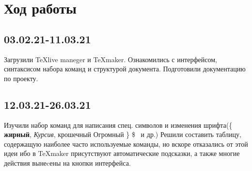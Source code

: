 \documentclass[a4paper,12pt]{report}
\begin{document}
\section{Ход работы}

\subsection{03.02.21-11.03.21}
Загрузили \TeX live maneger и \TeX maker. Ознакомились с интерфейсом, синтаксисом набора команд и структурой документа. Подготовили документацию по проекту.

\subsection{12.03.21-26.03.21}
Изучили набор команд для написания спец. символов и изменения шрифта(\{ \textbf{жирный}, \textsl{Курсив}, {\tiny крошечный} {\Huge Огромный} \} \$ \texteuro \   и др.)
Решили составить таблицу, содержащую наиболее часто используемые команды, но вскоре отказались от этой идеи ибо в \TeX maker присутствуют автоматические подсказки, а также многие действия вынеcены на кнопки интерфейса. 
\end{document}

